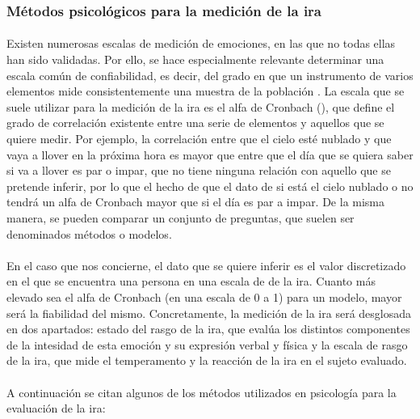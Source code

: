 
\subsubsection{Métodos psicológicos para la medición de la ira}

\paragraph{}
Existen numerosas escalas de medición de emociones, en las que no todas ellas han sido validadas. Por ello, se hace especialmente relevante determinar una escala común de confiabilidad, es decir, del grado en que un instrumento de varios elementos mide consistentemente una muestra de la población \citep{celina2005aproximacion}. La escala que se suele utilizar para la medición de la ira es el alfa de Cronbach (\citeyear{cronbach1951coefficient}), que define el grado de correlación existente entre una serie de elementos y aquellos que se quiere medir. Por ejemplo, la correlación entre que el cielo esté nublado y que vaya a llover en la próxima hora es mayor que entre que el día que se quiera saber si va a llover es par o impar, que no tiene ninguna relación con aquello que se pretende inferir, por lo que el hecho de que el dato de si está el cielo nublado o no tendrá un alfa de Cronbach mayor que si el día es par a impar. De la misma manera, se pueden comparar un conjunto de preguntas, que suelen ser denominados métodos o modelos.

\paragraph{}
En el caso que nos concierne, el dato que se quiere inferir es el valor discretizado en el que se encuentra una persona en una escala de de la ira. Cuanto más elevado sea el alfa de Cronbach (en una escala de 0 a 1) para un modelo, mayor será la fiabilidad del mismo. Concretamente, la medición de la ira será desglosada en dos apartados: estado del rasgo de la ira, que evalúa los distintos componentes de la intesidad de esta emoción y su expresión verbal y física y la escala de rasgo de la ira, que mide el temperamento y la reacción de la ira en el sujeto evaluado. 

\paragraph{}
A continuación se citan algunos de los métodos utilizados en psicología para la evaluación de la ira:

